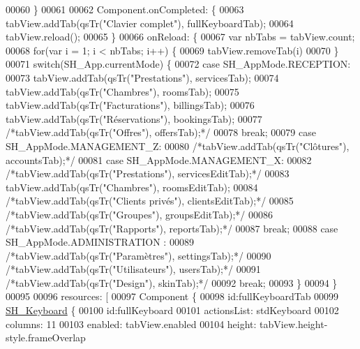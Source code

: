 \begin{DoxyCode}
00060     \}
00061 
00062     Component.onCompleted: \{
00063         tabView.addTab(qsTr(\textcolor{stringliteral}{"Clavier complet"}), fullKeyboardTab);
00064         tabView.reload();
00065     \}
00066     onReload: \{
00067         var nbTabs = tabView.count;
00068         \textcolor{keywordflow}{for}(var i = 1; i < nbTabs; i++) \{
00069             tabView.removeTab(i)
00070         \}
00071         \textcolor{keywordflow}{switch}(SH\_App.currentMode) \{
00072         \textcolor{keywordflow}{case} SH\_AppMode.RECEPTION:
00073             tabView.addTab(qsTr(\textcolor{stringliteral}{"Prestations"}), servicesTab);
00074             tabView.addTab(qsTr(\textcolor{stringliteral}{"Chambres"}), roomsTab);
00075             tabView.addTab(qsTr(\textcolor{stringliteral}{"Facturations"}), billingsTab);
00076             tabView.addTab(qsTr(\textcolor{stringliteral}{"Réservations"}), bookingsTab);
00077             \textcolor{comment}{/*tabView.addTab(qsTr("Offres"), offersTab);*/}
00078             \textcolor{keywordflow}{break};
00079         \textcolor{keywordflow}{case} SH\_AppMode.MANAGEMENT\_Z:
00080             \textcolor{comment}{/*tabView.addTab(qsTr("Clôtures"), accountsTab);*/}
00081         \textcolor{keywordflow}{case} SH\_AppMode.MANAGEMENT\_X:
00082             \textcolor{comment}{/*tabView.addTab(qsTr("Prestations"), servicesEditTab);*/}
00083             tabView.addTab(qsTr(\textcolor{stringliteral}{"Chambres"}), roomsEditTab);
00084             \textcolor{comment}{/*tabView.addTab(qsTr("Clients privés"), clientsEditTab);*/}
00085             \textcolor{comment}{/*tabView.addTab(qsTr("Groupes"), groupsEditTab);*/}
00086             \textcolor{comment}{/*tabView.addTab(qsTr("Rapports"), reportsTab);*/}
00087             \textcolor{keywordflow}{break};
00088         \textcolor{keywordflow}{case} SH\_AppMode.ADMINISTRATION :
00089             \textcolor{comment}{/*tabView.addTab(qsTr("Paramètres"), settingsTab);*/}
00090             \textcolor{comment}{/*tabView.addTab(qsTr("Utilisateurs"), usersTab);*/}
00091             \textcolor{comment}{/*tabView.addTab(qsTr("Design"), skinTab);*/}
00092             \textcolor{keywordflow}{break};
00093         \}
00094     \}
00095 
00096     resources: [
00097         Component \{
00098             \textcolor{keywordtype}{id}:fullKeyboardTab
00099             \hyperlink{classSH__Keyboard}{SH\_Keyboard} \{
00100                 \textcolor{keywordtype}{id}:fullKeyboard
00101                 actionsList: stdKeyboard
00102                 columns: 11
00103                 enabled: tabView.enabled
00104                 height: tabView.height-style.frameOverlap

\end{DoxyCode}
